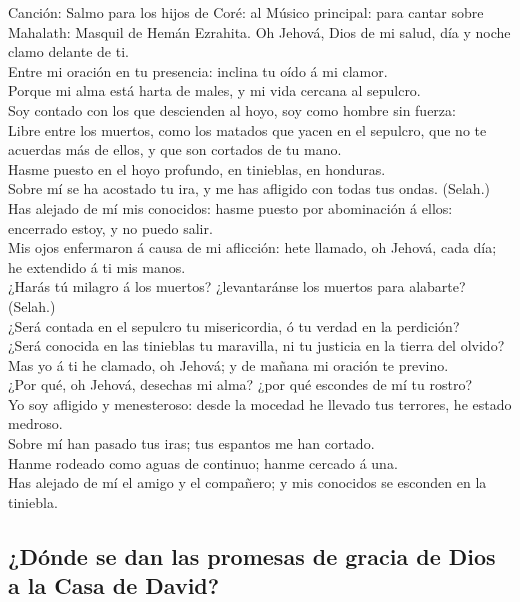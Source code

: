  Canción: Salmo para los hijos de Coré: al Músico
principal: para cantar sobre Mahalath: Masquil de Hemán Ezrahita. Oh
Jehová, Dios de mi salud, día y noche clamo delante de ti.\\
 Entre mi oración en tu presencia: inclina tu oído á mi
clamor.\\
 Porque mi alma está harta de males, y mi vida cercana al
sepulcro.\\
 Soy contado con los que descienden al hoyo, soy como
hombre sin fuerza:\\
 Libre entre los muertos, como los matados que yacen en el
sepulcro, que no te acuerdas más de ellos, y que son cortados de tu
mano.\\
 Hasme puesto en el hoyo profundo, en tinieblas, en
honduras.\\
 Sobre mí se ha acostado tu ira, y me has afligido con
todas tus ondas. (Selah.)\\
 Has alejado de mí mis conocidos: hasme puesto por
abominación á ellos: encerrado estoy, y no puedo salir.\\
 Mis ojos enfermaron á causa de mi aflicción: hete
llamado, oh Jehová, cada día; he extendido á ti mis manos.\\
 ¿Harás tú milagro á los muertos? ¿levantaránse los
muertos para alabarte? (Selah.)\\
 ¿Será contada en el sepulcro tu misericordia, ó tu
verdad en la perdición?\\
 ¿Será conocida en las tinieblas tu maravilla, ni tu
justicia en la tierra del olvido?\\
 Mas yo á ti he clamado, oh Jehová; y de mañana mi
oración te previno.\\
 ¿Por qué, oh Jehová, desechas mi alma? ¿por qué escondes
de mí tu rostro?\\
 Yo soy afligido y menesteroso: desde la mocedad he
llevado tus terrores, he estado medroso.\\
 Sobre mí han pasado tus iras; tus espantos me han
cortado.\\
 Hanme rodeado como aguas de continuo; hanme cercado á
una.\\
 Has alejado de mí el amigo y el compañero; y mis
conocidos se esconden en la tiniebla.

\hypertarget{duxf3nde-se-dan-las-promesas-de-gracia-de-dios-a-la-casa-de-david}{%
\subsection{¿Dónde se dan las promesas de gracia de Dios a la Casa de
David?}\label{duxf3nde-se-dan-las-promesas-de-gracia-de-dios-a-la-casa-de-david}}

